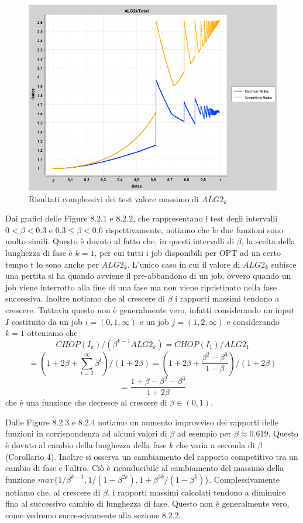 \documentclass[12pt]{article}
\begin{document}
\begin{figure}[H]
\caption{Risultati complessivi dei test valore massimo di $ALG2_{k}$}
\centering
\includegraphics[scale=0.4]{max/ALG2kTotal.png}
\end{figure}
Dai grafici delle Figure 8.2.1 e 8.2.2, che rappresentano i test degli intervalli $0<\beta <0.3$ e $0.3 \leq \beta < 0.6$ rispettivamente, notiamo che le due funzioni sono molto simili. Questo è dovuto al fatto che, in questi intervalli di $\beta$, la scelta della lunghezza di fase è $k=1$, per cui tutti i job disponibili per OPT ad un certo tempo t lo sono anche per $ALG2_{k}$. L'unico caso in cui il valore di $ALG2_{k}$ subisce una pertita si ha quando avviene il pre-abbandono di un job, ovvero quando un job viene interrotto alla fine di una fase ma non viene ripristinato nella fase successiva. Inoltre notiamo che al crescere di $\beta$ i rapporti massimi tendono a crescere. Tuttavia questo non è generalmente vero, infatti considerando un input $I$ costituito da un job $i = (0,1,\infty)$ e un job $j = (1,2,\infty)$ e considerando $k = 1$ otteniamo che $$CHOP(I_{k})/(\beta^{k-1}ALG2_{k}) = CHOP(I_{1})/ALG2_{1}$$ $$= (1 + 2\beta + \sum_{t = 2}^{\infty}\beta^{t}) / (1 + 2\beta) = (1 + 2\beta + \frac{\beta^{2} - \beta^{3}}{1 - \beta}) / (1 + 2\beta)$$
$$= \frac{1 + \beta - \beta^{2} - \beta^{3}}{1 + 2\beta}$$ \newline
che è una funzione che decresce al crescere di $\beta \in (0, 1)$.

Dalle Figure 8.2.3 e 8.2.4 notiamo un aumento improvviso dei rapporti delle funzioni in corrispondenza ad alcuni valori di $\beta$ ad esempio per $\beta \approx 0.619$. Questo è dovuto al cambio della lunghezza della fase $k$ che varia a seconda di $\beta$ (Corollario 4). Inoltre si osserva un cambiamento del rapporto competitivo tra un cambio di fase e l'altro. Ciò è riconducibile al cambiamento del massimo della funzione $max \{1 / \beta^{k - 1}, 1 / (1 - \beta^{2k}), 1 + \beta^{3k} / (1 - \beta^{k})\}$. Complessivamente notiamo che, al crescere di $\beta$, i rapporti massimi calcolati tendono a diminuire fino al successivo cambio di lunghezza di fase. Questo non è generalmente vero, come vedremo successivamente alla sezione 8.2.2.
\end{document}
